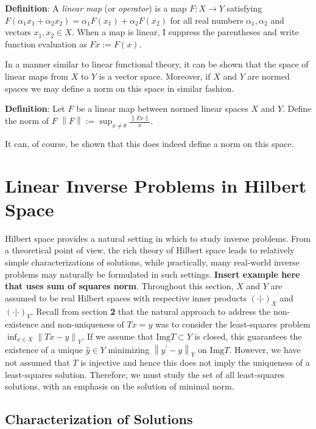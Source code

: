 \documentclass[12pt]{article}
\newcommand*{\norm}[1]{\left\lVert#1\right\rVert}
\newcommand{\Img}{\mathrm{Img}}
\begin{document}
 \textbf{Definition}: A \textit{linear map} (or \textit{operator}) is a map $F: X \to Y$ satisfying $F(\alpha_1x_1 + \alpha_2x_2) = \alpha_1F(x_1) + \alpha_2F(x_2)$ for all real numbers $\alpha_1, \alpha_2$ and vectors $x_1, x_2 \in X$. When a map is linear, I suppress the parentheses and write function evaluation as $Fx := F(x)$. 

In a manner similar to linear functional theory, it can be shown that the space of linear maps from $X$ to $Y$ is a vector space. Moreover, if $X$ and $Y$ are normed spaces we may define a norm on this space in similar fashion. 

\textbf{Definition}: Let $F$ be a linear map between normed linear spaces $X$ and $Y$. Define the norm of $F$ $\norm{F} := \sup_{x \neq \theta} \frac{\norm{Fx}}{x}$. 

It can, of course, be shown that this does indeed define a norm on this space. 


\section{Linear Inverse Problems in Hilbert Space}

Hilbert space provides a natural setting in which to study inverse problems. From a theoretical point of view, the rich theory of Hilbert space leads to relatively simple characterizations of solutions, while practically, many real-world inverse problems may naturally be formulated in such settings. \textbf{Insert example here that uses sum of squares norm}. Throughout this section, $X$ and $Y$ are assumed to be real Hilbert spaces with respective inner products $(\cdot | \cdot)_X$ and $(\cdot | \cdot)_Y$. Recall from section \textbf{2} that the natural approach to address the non-existence and non-uniqueness of $Tx = y$ was to consider the least-squares problem $\inf_{x \in X} \norm{Tx - y}_Y$. If we assume that $\Img T \subset Y$ is closed, this guarantees the existence of a unique $\hat{y} \in Y$ minimizing $\norm{y^\prime - y}_Y$ on $\Img T$. However, we have not assumed that $T$ is injective and hence this does not imply the uniqueness of a least-squares solution. Therefore, we must study the set of all least-squares solutions, with an emphasis on the solution of minimal norm. 

\subsection{Characterization of Solutions}
\end{document}
